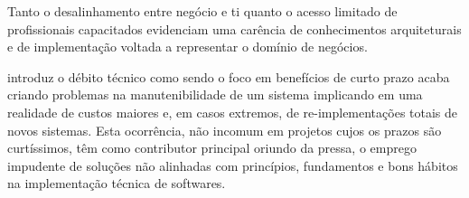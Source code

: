     Tanto o desalinhamento entre negócio e \ac{ti} quanto o acesso limitado de profissionais capacitados
    evidenciam uma carência de conhecimentos arquiteturais e de implementação voltada a
    representar o domínio de negócios.

     introduz o débito técnico como
    sendo o foco em benefícios de curto prazo acaba criando problemas na manutenibilidade
    de um sistema implicando em uma realidade de custos maiores e, em casos extremos,
    de re-implementações totais de novos sistemas. Esta ocorrência, não incomum em
    projetos cujos os prazos são curtíssimos, têm como contributor principal
    oriundo da pressa, o emprego impudente de soluções não alinhadas com princípios, 
    fundamentos e bons hábitos na implementação técnica de softwares.
